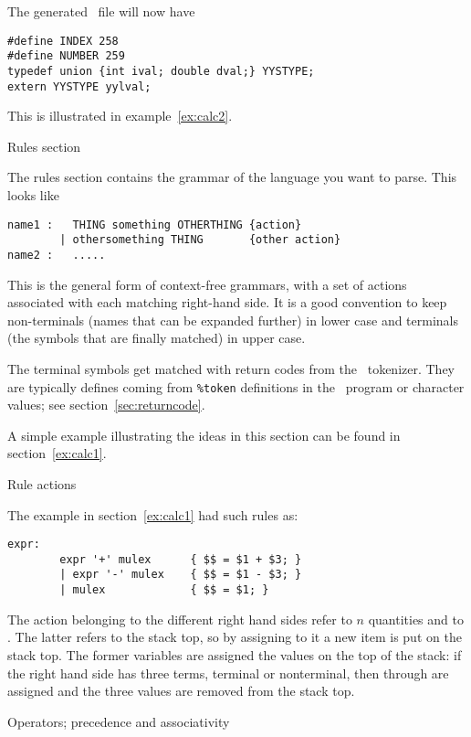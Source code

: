 The generated ~file will now have
\begin{verbatim}
#define INDEX 258
#define NUMBER 259
typedef union {int ival; double dval;} YYSTYPE;
extern YYSTYPE yylval;
\end{verbatim}

This is illustrated in example~\ref{ex:calc2}.

 {Rules section}

The rules section contains the grammar of the language you want to
parse. This looks like
\begin{verbatim}
name1 :   THING something OTHERTHING {action}
        | othersomething THING       {other action}
name2 :   .....
\end{verbatim}
This is the general form of context-free grammars, with a set of
actions associated with each matching right-hand side. It is a good
convention to keep non-terminals (names that can be expanded further)
in lower case and terminals (the symbols that are finally matched) in
upper case.

The terminal symbols get matched with return codes from the
\lex\ tokenizer. They are typically defines coming from \verb+%token+
definitions in the \yacc\ program or character values; see
section~\ref{sec:returncode}.

A simple example illustrating the ideas in this section can be found in
section~\ref{ex:calc1}.

 {Rule actions}
\label{yacc:rule-rhs}

The example in section~\ref{ex:calc1} had such rules as:
\begin{verbatim}
expr:
        expr '+' mulex      { $$ = $1 + $3; }
        | expr '-' mulex    { $$ = $1 - $3; }
        | mulex             { $$ = $1; }
\end{verbatim}
The action belonging to the different right hand sides refer to
\n{\$}$n$ quantities and to \n{\$\$}. The latter refers to the stack
top, so by assigning to it a new item is put on the stack top. The former
variables are assigned the values on the top of the stack: if the
right hand side has three terms, terminal or nonterminal, then 
through  are assigned and the three values are removed from the
stack top.

 {Operators; precedence and associativity}
\label{yacc:ops}

